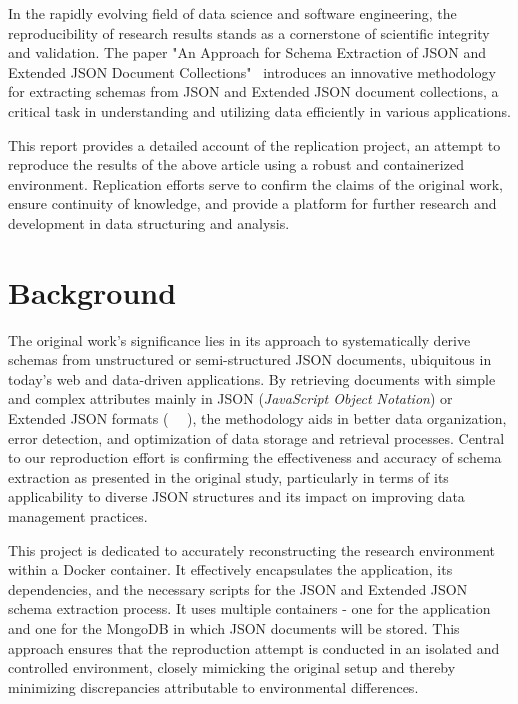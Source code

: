 \documentclass[sigconf, nonacm]{acmart}
\begin{document}
In the rapidly evolving field of data science and software engineering, the reproducibility of research results stands as a cornerstone of scientific integrity and validation. The paper "An Approach for Schema Extraction of JSON and Extended JSON Document Collections"~\cite{JsonSchemaDiscovery} introduces an innovative methodology for extracting schemas from JSON and Extended JSON document collections, a critical task in understanding and utilizing data efficiently in various applications.

This report provides a detailed account of the replication project, an attempt to reproduce the results of the above article using a robust and containerized environment. Replication efforts serve to confirm the claims of the original work, ensure continuity of knowledge, and provide a platform for further research and development in data structuring and analysis.

\section{Background}

The original work’s significance lies in its approach to systematically derive schemas from unstructured or semi-structured JSON documents, ubiquitous in today’s web and data-driven applications. By retrieving documents with simple and complex attributes mainly in JSON (\textit{JavaScript Object Notation}) or Extended JSON formats (~\cite{6106531} ~\cite{7592700}), the methodology aids in better data organization, error detection, and optimization of data storage and retrieval processes. Central to our reproduction effort is confirming the effectiveness and accuracy of schema extraction as presented in the original study, particularly in terms of its applicability to diverse JSON structures and its impact on improving data management practices.

This project is dedicated to accurately reconstructing the research environment within a Docker container. It effectively encapsulates the application, its dependencies, and the necessary scripts for the JSON and Extended JSON schema extraction process. It uses multiple containers - one for the application and one for the MongoDB in which JSON documents will be stored. This approach ensures that the reproduction attempt is conducted in an isolated and controlled environment, closely mimicking the original setup and thereby minimizing discrepancies attributable to environmental differences. 
\end{document}
